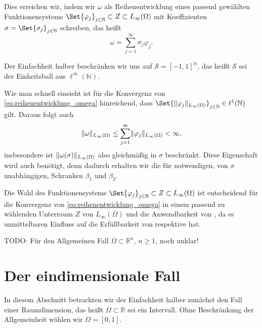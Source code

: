 Dies erreichen wir, indem wir $\omega$ als Reihenentwicklung eines passend gewählten Funktionensystems $\Set{ \varphi_{j} }_{j \in \mathbb{N}} \subset Z \subset L_{\infty}(\Omega)$ mit Koeffizienten $\sigma = \Set{\sigma_{j}}_{j \in \mathbb{N}}$ schreiben, das heißt
\begin{equation}
    \label{eq:reihenentwicklung_omega}
    \omega = \sum_{j = 1}^{\infty} \sigma_{j} \varphi_{j}.
\end{equation}

Der Einfachheit halber beschränken wir uns auf $\mathcal S = [-1, 1]^{\mathbb{N}}$, das heißt $\mathcal S$ sei der Einheitsball aus $\ell^{\infty}(\mathbb{N})$.

Wie man  schnell einsieht ist für die Konvergenz von \eqref{eq:reihenentwicklung_omega} hinreichend, dass $\Set{ \norm{\varphi_{j}}_{L_{\infty}(\Omega)} }_{j \in \mathbb{N}} \in \ell^{1}(\mathbb{N})$ gilt.
Daraus folgt auch
\begin{equation}
    \lVert\omega\rVert_{L_{\infty}(\Omega)} \leq \sum_{j = 1}^{\infty} \lVert\varphi_{j}\rVert_{L_{\infty}(\Omega)} < \infty,
\end{equation}
insbesondere ist $\lVert\omega(\sigma)\rVert_{L_{\infty}(\Omega)}$ also gleichmäßig in $\sigma$ beschränkt.
Diese Eigenschaft wird auch benötigt, denn dadurch erhalten wir die für  notwendigen, von $\sigma$ unabhängigen, Schranken $\beta_{1}$ und $\beta_{2}$.

Die Wahl des Funktionensystems $\Set{ \varphi_{j} }_{j \in \mathbb{N}} \subset Z \subset L_{\infty}(\Omega)$ ist entscheidend für die Konvergenz von \eqref{eq:reihenentwicklung_omega} in einem passend zu wählenden Unterraum $Z$ von $L_{\infty}(\Omega)$ und die Anwendbarkeit von , da es unmittelbaren Einfluss auf die Erfüllbarkeit von  respektive  hat.

TODO: Für den Allgemeinen Fall $\Omega \subset \mathbb{R}^{n}$, $n \geq 1$, noch unklar!


\section{Der eindimensionale Fall} %
\label{sec:der_eindimensionale_fall}

In diesem Abschnitt betrachten wir der Einfachheit halber zunächst den Fall einer Raumdimension, das heißt $\Omega \subset \mathbb{R}$ sei ein Intervall.
Ohne Beschränkung der Allgemeinheit wählen wir $\Omega = [0, 1]$.


